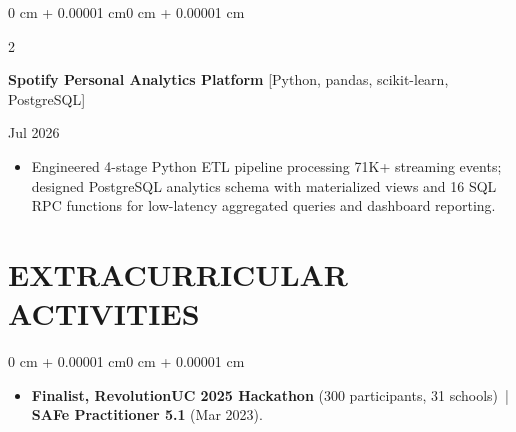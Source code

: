 \documentclass[10pt, letterpaper]{article}
\newenvironment{highlights}{
    \begin{itemize}[
        topsep=0.10 cm,
        parsep=0.06 cm,
        partopsep=0pt,
        itemsep=0.06 cm,
        leftmargin=12pt
    ]
}{
    \end{itemize}
}
\newenvironment{onecolentry}{
    \begin{adjustwidth}{0 cm + 0.00001 cm}{0 cm + 0.00001 cm}
}{
    \end{adjustwidth}
}
\newenvironment{twocolentry}[2][]{
    \onecolentry
    \def\secondColumn{#2}
    \setcolumnwidth{\fill, 4.5 cm}
    \begin{paracol}{2}
}{
    \switchcolumn \raggedleft \secondColumn
    \end{paracol}
    \endonecolentry
}
\begin{document}
\vspace{0.12 cm}

\begin{twocolentry}{Jul 2026}
\textbf{Spotify Personal Analytics Platform} [Python, pandas, scikit-learn, PostgreSQL]
\end{twocolentry}
\begin{highlights}
  \item Engineered 4-stage Python ETL pipeline processing 71K+ streaming events; designed PostgreSQL analytics schema with materialized views and 16 SQL RPC functions for low-latency aggregated queries and dashboard reporting.
\end{highlights}

\section{EXTRACURRICULAR ACTIVITIES}
\begin{onecolentry}
\begin{highlights}
  \item \textbf{Finalist, RevolutionUC 2025 Hackathon} (300 participants, 31 schools) \,|\, \textbf{SAFe Practitioner 5.1} (Mar 2023).
\end{highlights}
\end{onecolentry}
\end{document}
